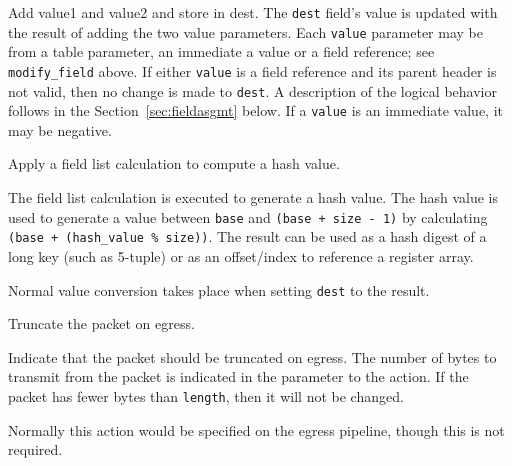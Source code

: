 \documentclass[12pt]{article}
\begin{document}

{ %
Add value1 and value2 and store in dest.
}
{ %
}
{ %
The \texttt{dest} field's value is updated with the result of adding
the two value parameters. Each \texttt{value} parameter may be from a
table parameter, an immediate a value {\color{red}or a field reference}; see \texttt{modify_field} above.  If either \texttt{value}
is a field reference and its parent header is not valid, then no
change is made to \texttt{dest}.  A description of the logical
behavior follows in the Section~\ref{sec:fieldasgmt} below.  If a
\texttt{value} is an immediate value, it may be negative.
}


{ %
{\color{red}Apply a field list calculation to compute a hash value.}
}
{ %
}
{ %
The field list calculation is executed to generate a hash value.  
The hash value is used to generate a value between \texttt{base} and 
\texttt{(base + size - 1)} by calculating \texttt{(base + (hash_value \% size))}. 
{\color{red}
The result can be used as a hash digest of a long key (such as 5-tuple) or as 
an offset/index to reference a register array. }

Normal value conversion takes place when setting \texttt{dest} to the result.
}


{ %
Truncate the packet on egress.
}
{ %
}
{ %
Indicate that the packet should be truncated on egress.  The number of bytes 
to transmit from the packet is indicated in the parameter to the action.  If 
the packet has fewer bytes than \texttt{length}, then it will not be changed.

Normally this action would be specified on the egress pipeline, though this 
is not required.
}
\end{document}
